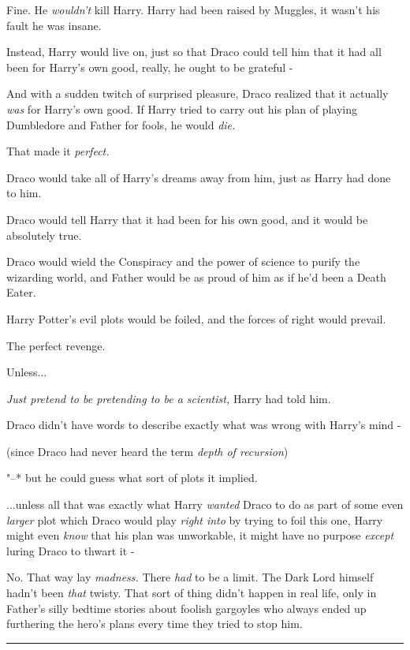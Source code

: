 Fine. He \emph{wouldn't} kill Harry. Harry had been raised by Muggles,
it wasn't his fault he was insane.

Instead, Harry would live on, just so that Draco could tell him that it
had all been for Harry's own good, really, he ought to be grateful -

And with a sudden twitch of surprised pleasure, Draco realized that it
actually \emph{was} for Harry's own good. If Harry tried to carry out
his plan of playing Dumbledore and Father for fools, he would
\emph{die.}

That made it \emph{perfect.}

Draco would take all of Harry's dreams away from him, just as Harry had
done to him.

Draco would tell Harry that it had been for his own good, and it would
be absolutely true.

Draco would wield the Conspiracy and the power of science to purify the
wizarding world, and Father would be as proud of him as if he'd been a
Death Eater.

Harry Potter's evil plots would be foiled, and the forces of right would
prevail.

The perfect revenge.

Unless...

\emph{Just pretend to be pretending to be a scientist,} Harry had told
him.

Draco didn't have words to describe exactly what was wrong with Harry's
mind -

(since Draco had never heard the term \emph{depth of recursion})

"--* but he could guess what sort of plots it implied.

...unless all that was exactly what Harry \emph{wanted} Draco to do
as part of some even \emph{larger} plot which Draco would play
\emph{right into} by trying to foil this one, Harry might even
\emph{know} that his plan was unworkable, it might have no purpose
\emph{except} luring Draco to thwart it -

No. That way lay \emph{madness.} There \emph{had} to be a limit. The
Dark Lord himself hadn't been \emph{that} twisty. That sort of thing
didn't happen in real life, only in Father's silly bedtime stories about
foolish gargoyles who always ended up furthering the hero's plans every
time they tried to stop him.

\begin{center}\rule{3in}{0.4pt}\end{center}

